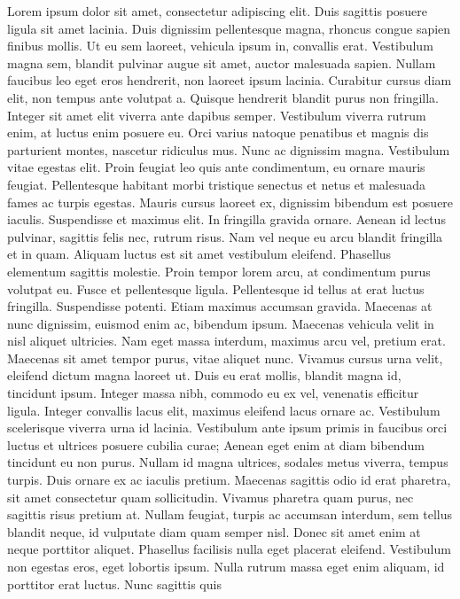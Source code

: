 \documentclass[
  ngerman,
  14pt,
  a4paper,
  DIV=11,
  twoside]{scrreprt}
\begin{document}
Lorem ipsum dolor sit amet, consectetur adipiscing elit. Duis sagittis
posuere ligula sit amet lacinia. Duis dignissim pellentesque magna,
rhoncus congue sapien finibus mollis. Ut eu sem laoreet, vehicula ipsum
in, convallis erat. Vestibulum magna sem, blandit pulvinar augue sit
amet, auctor malesuada sapien. Nullam faucibus leo eget eros hendrerit,
non laoreet ipsum lacinia. Curabitur cursus diam elit, non tempus ante
volutpat a. Quisque hendrerit blandit purus non fringilla. Integer sit
amet elit viverra ante dapibus semper. Vestibulum viverra rutrum enim,
at luctus enim posuere eu. Orci varius natoque penatibus et magnis dis
parturient montes, nascetur ridiculus mus. Nunc ac dignissim magna.
Vestibulum vitae egestas elit. Proin feugiat leo quis ante condimentum,
eu ornare mauris feugiat. Pellentesque habitant morbi tristique senectus
et netus et malesuada fames ac turpis egestas. Mauris cursus laoreet ex,
dignissim bibendum est posuere iaculis. Suspendisse et maximus elit. In
fringilla gravida ornare. Aenean id lectus pulvinar, sagittis felis nec,
rutrum risus. Nam vel neque eu arcu blandit fringilla et in quam.
Aliquam luctus est sit amet vestibulum eleifend. Phasellus elementum
sagittis molestie. Proin tempor lorem arcu, at condimentum purus
volutpat eu. Fusce et pellentesque ligula. Pellentesque id tellus at
erat luctus fringilla. Suspendisse potenti. Etiam maximus accumsan
gravida. Maecenas at nunc dignissim, euismod enim ac, bibendum ipsum.
Maecenas vehicula velit in nisl aliquet ultricies. Nam eget massa
interdum, maximus arcu vel, pretium erat. Maecenas sit amet tempor
purus, vitae aliquet nunc. Vivamus cursus urna velit, eleifend dictum
magna laoreet ut. Duis eu erat mollis, blandit magna id, tincidunt
ipsum. Integer massa nibh, commodo eu ex vel, venenatis efficitur
ligula. Integer convallis lacus elit, maximus eleifend lacus ornare ac.
Vestibulum scelerisque viverra urna id lacinia. Vestibulum ante ipsum
primis in faucibus orci luctus et ultrices posuere cubilia curae; Aenean
eget enim at diam bibendum tincidunt eu non purus. Nullam id magna
ultrices, sodales metus viverra, tempus turpis. Duis ornare ex ac
iaculis pretium. Maecenas sagittis odio id erat pharetra, sit amet
consectetur quam sollicitudin. Vivamus pharetra quam purus, nec sagittis
risus pretium at. Nullam feugiat, turpis ac accumsan interdum, sem
tellus blandit neque, id vulputate diam quam semper nisl. Donec sit amet
enim at neque porttitor aliquet. Phasellus facilisis nulla eget placerat
eleifend. Vestibulum non egestas eros, eget lobortis ipsum. Nulla rutrum
massa eget enim aliquam, id porttitor erat luctus. Nunc sagittis quis
\end{document}
